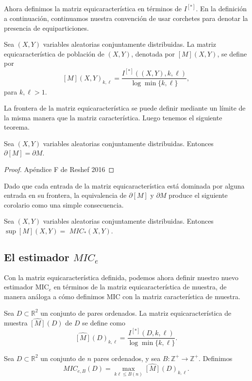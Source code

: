         Ahora definimos la matriz equicaracter\'istica en t\'erminos de $I^{[*]}$. En la definici\'on a continuaci\'on, continuamos nuestra convenci\'on de usar corchetes para denotar la presencia de equiparticiones.
    
        \begin{defn}
            Sea $(X, Y)$ variables aleatorias conjuntamente distribuidas. La matriz equicaracter\'istica de poblaci\'on de $(X, Y)$, denotada por $[M](X, Y)$, se define por
            $$
            [M](X, Y)_{k, \ell}=\frac{I^{[*]}((X, Y), k, \ell)}{\log \min \{k, \ell\}},
            $$
            para $k, \ell>1$.
        \end{defn}
    
        La frontera de la matriz equicaracter\'istica se puede definir mediante un l\'imite de la misma manera que la matriz caracter\'istica. Luego tenemos el siguiente teorema.
    
        \begin{thm}
            Sea $(X, Y)$ variables aleatorias conjuntamente distribuidas. Entonces $\partial[M]=\partial M$.
        \end{thm}
        \begin{proof}
            Ap\'endice F de Reshef 2016
        \end{proof}
    
        Dado que cada entrada de la matriz equicaracter\'istica est\'a dominada por alguna entrada en su frontera, la equivalencia de $\partial[M]$ y $\partial M$ produce el siguiente corolario como una simple consecuencia.
    
        \begin{cor}
            Sea $(X, Y)$ variables aleatorias conjuntamente distribuidas. Entonces $\sup [M](X, Y)=$ $M I C_*(X, Y)$.
        \end{cor}
    
        \subsection[short]{El estimador $MIC_e$}
    
        Con la matriz equicaracter\'istica definida, podemos ahora definir nuestro nuevo estimador $\mathrm{MIC}_e$ en t\'erminos de la matriz equicaracter\'istica de muestra, de manera an\'aloga a c\'omo definimos MIC con la matriz caracter\'istica de muestra.
    
        \begin{defn}
            Sea $D \subset \mathbb{R}^2$ un conjunto de pares ordenados. La matriz equicaracter\'istica de muestra $\widehat{[{M}]}(D)$ de $D$ se define como
            $$
            \widehat{[{M}]}(D)_{k, \ell}=\frac{I^{[*]}(D, k, \ell)}{\log \min \{k, \ell\}} .
            $$
        \end{defn}
        \begin{defn}
            Sea $D \subset \mathbb{R}^2$ un conjunto de $n$ pares ordenados, y sea $B: \mathbb{Z}^{+} \rightarrow \mathbb{Z}^{+}$. Definimos
            $$
            M I C_{e, B}(D)=\max _{k \ell \leq B(n)} \widehat{[M]}(D)_{k, \ell}.
            $$
        \end{defn}
    
